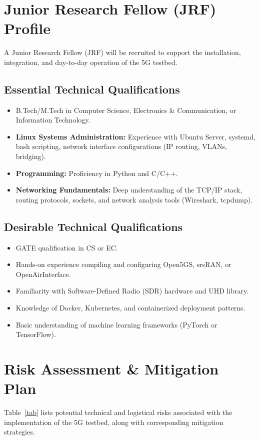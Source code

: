 \documentclass[12pt,a4paper]{article}\usepackage[a4paper,margin=1in]{geometry}\usepackage{graphicx}\usepackage{longtable}\usepackage{booktabs}\usepackage{hyperref}\usepackage{enumitem}\usepackage{amsmath}\usepackage{tikz}\usepackage{pgfgantt}\usepackage{setspace}\setstretch{1.15}\usetikzlibrary{positioning,arrows.meta,shapes.geometric}
\begin{document}
		\section{Junior Research Fellow (JRF) Profile}A Junior Research Fellow (JRF) will be recruited to support the installation, integration, and day-to-day operation of the 5G testbed.
		
		\subsection{Essential Technical Qualifications}\begin{itemize}\item B.Tech/M.Tech in Computer Science, Electronics \& Communication, or Information Technology.\item \textbf{Linux Systems Administration:} Experience with Ubuntu Server, systemd, bash scripting, network interface configurations (IP routing, VLANs, bridging).\item \textbf{Programming:} Proficiency in Python and C/C++.\item \textbf{Networking Fundamentals:} Deep understanding of the TCP/IP stack, routing protocols, sockets, and network analysis tools (Wireshark, tcpdump).\end{itemize}
		
		\subsection{Desirable Technical Qualifications}\begin{itemize}\item GATE qualification in CS or EC.\item Hands-on experience compiling and configuring Open5GS, srsRAN, or OpenAirInterface.\item Familiarity with Software-Defined Radio (SDR) hardware and UHD library.\item Knowledge of Docker, Kubernetes, and containerized deployment patterns.\item Basic understanding of machine learning frameworks (PyTorch or TensorFlow).\end{itemize}
		
		\section{Risk Assessment \& Mitigation Plan}Table~\ref{tab} lists potential technical and logistical risks associated with the implementation of the 5G testbed, along with corresponding mitigation strategies.
		
\end{document}
